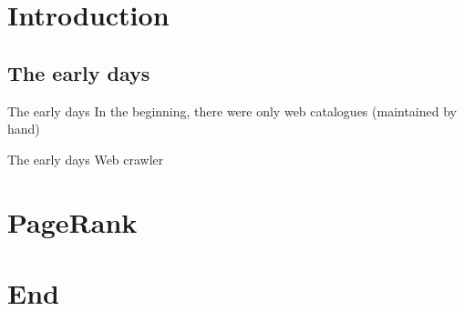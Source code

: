\documentclass[usepdftitle=false,hyperref={pdfpagelabels=false}]{beamer}
\begin{document}
\title{\titleText}
\subtitle{History, Algorithm}
\author{\tutor}
\date{\today}
\subject{Programmieren}

\frame{\titlepage}



\section{Introduction}
\subsection{The early days}
\begin{frame}{The early days}
    In the beginning, there were only web catalogues (maintained by hand)
\end{frame}

\begin{frame}{The early days}
    Web crawler
\end{frame}

\section{PageRank}


\section{End}


\end{document}
